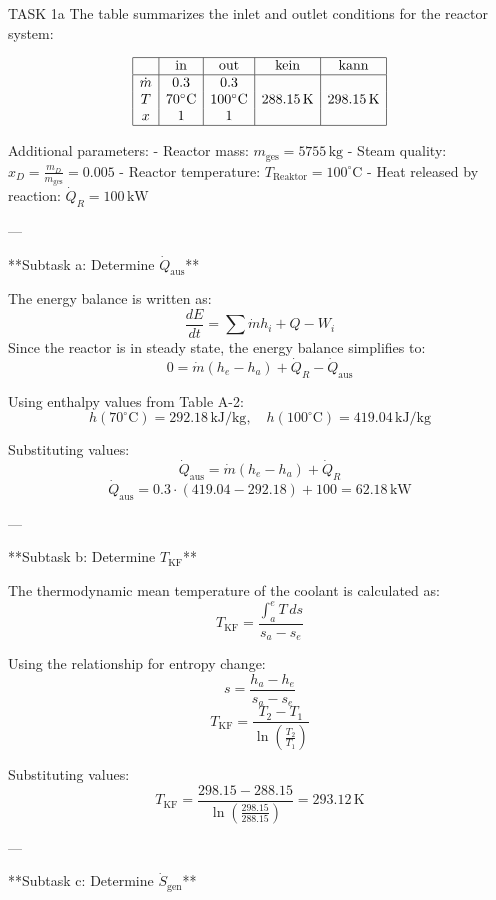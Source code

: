 TASK 1a  
The table summarizes the inlet and outlet conditions for the reactor system:  

\[
\begin{array}{|c|c|c|c|c|}
\hline
 & \text{in} & \text{out} & \text{kein} & \text{kann} \\
\hline
\dot{m} & 0.3 & 0.3 & & \\
T & 70^\circ\text{C} & 100^\circ\text{C} & 288.15 \, \text{K} & 298.15 \, \text{K} \\
x & 1 & 1 & & \\
\hline
\end{array}
\]

Additional parameters:  
- Reactor mass: \( m_{\text{ges}} = 5755 \, \text{kg} \)  
- Steam quality: \( x_D = \frac{m_D}{m_{\text{ges}}} = 0.005 \)  
- Reactor temperature: \( T_{\text{Reaktor}} = 100^\circ\text{C} \)  
- Heat released by reaction: \( \dot{Q}_R = 100 \, \text{kW} \)  

---

**Subtask a: Determine \( \dot{Q}_{\text{aus}} \)**  

The energy balance is written as:  
\[
\frac{dE}{dt} = \sum \dot{m} h_i + Q - W_i
\]  
Since the reactor is in steady state, the energy balance simplifies to:  
\[
0 = \dot{m} (h_e - h_a) + \dot{Q}_R - \dot{Q}_{\text{aus}}
\]  

Using enthalpy values from Table A-2:  
\[
h(70^\circ\text{C}) = 292.18 \, \text{kJ/kg}, \quad h(100^\circ\text{C}) = 419.04 \, \text{kJ/kg}
\]  

Substituting values:  
\[
\dot{Q}_{\text{aus}} = \dot{m} (h_e - h_a) + \dot{Q}_R
\]  
\[
\dot{Q}_{\text{aus}} = 0.3 \cdot (419.04 - 292.18) + 100 = 62.18 \, \text{kW}
\]  

---

**Subtask b: Determine \( T_{\text{KF}} \)**  

The thermodynamic mean temperature of the coolant is calculated as:  
\[
T_{\text{KF}} = \frac{\int_a^e T \, ds}{s_a - s_e}
\]  

Using the relationship for entropy change:  
\[
s = \frac{h_a - h_e}{s_a - s_e}
\]  
\[
T_{\text{KF}} = \frac{T_2 - T_1}{\ln \left( \frac{T_2}{T_1} \right)}
\]  

Substituting values:  
\[
T_{\text{KF}} = \frac{298.15 - 288.15}{\ln \left( \frac{298.15}{288.15} \right)} = 293.12 \, \text{K}
\]  

---

**Subtask c: Determine \( \dot{S}_{\text{gen}} \)**  

